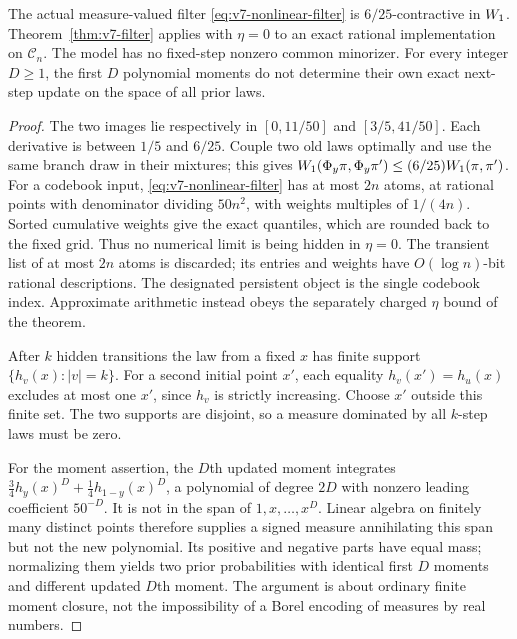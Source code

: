 \begin{corollary}
\label{cor:v7-nonlinear}
The actual measure-valued filter \eqref{eq:v7-nonlinear-filter} is
$6/25$-contractive in $W_1$. Theorem~\ref{thm:v7-filter} applies with
$\eta=0$ to an exact rational implementation on $\mathcal C_n$.
The model has no fixed-step nonzero common minorizer. For every integer
$D\ge1$, the first $D$ polynomial moments do not determine their own
exact next-step update on the space of all prior laws.
\end{corollary}
\begin{proof}
The two images lie respectively in $[0,11/50]$ and $[3/5,41/50]$.
Each derivative is between $1/5$ and $6/25$. Couple two old laws
optimally and use the same branch draw in their mixtures; this gives
$W_1(\Phi_y\pi,\Phi_y\pi')\le(6/25)W_1(\pi,\pi')$.
For a codebook input, \eqref{eq:v7-nonlinear-filter} has at most $2n$
atoms, at rational points with denominator dividing $50n^2$, with
weights multiples of $1/(4n)$. Sorted cumulative weights give the exact
quantiles, which are rounded back to the fixed grid. Thus no numerical
limit is being hidden in $\eta=0$. The transient list of at most $2n$
atoms is discarded; its entries and weights have $O(\log n)$-bit
rational descriptions. The designated persistent object is the single
codebook index. Approximate arithmetic instead obeys the separately
charged $\eta$ bound of the theorem.

After $k$ hidden transitions the law from a fixed $x$ has finite support
$\{h_v(x):|v|=k\}$. For a second initial point $x'$, each equality
$h_v(x')=h_u(x)$ excludes at most one $x'$, since $h_v$ is strictly
increasing. Choose $x'$ outside this finite set. The two supports are
disjoint, so a measure dominated by all $k$-step laws must be zero.

For the moment assertion, the $D$th updated moment integrates
$\tfrac34 h_y(x)^D+\tfrac14 h_{1-y}(x)^D$, a polynomial of degree $2D$
with nonzero leading coefficient $50^{-D}$. It is not in the span of
$1,x,\ldots,x^D$. Linear algebra on finitely many distinct points
therefore supplies a signed measure annihilating this span but not the
new polynomial. Its positive and negative parts have equal mass;
normalizing them yields two prior probabilities with identical first
$D$ moments and different updated $D$th moment. The argument is about
ordinary finite moment closure, not the impossibility of a Borel
encoding of measures by real numbers.
\end{proof}

